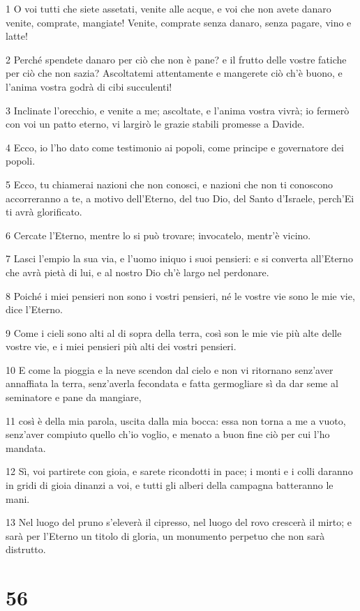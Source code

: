 \par 1 O voi tutti che siete assetati, venite alle acque, e voi che non avete danaro venite, comprate, mangiate! Venite, comprate senza danaro, senza pagare, vino e latte!
\par 2 Perché spendete danaro per ciò che non è pane? e il frutto delle vostre fatiche per ciò che non sazia? Ascoltatemi attentamente e mangerete ciò ch'è buono, e l'anima vostra godrà di cibi succulenti!
\par 3 Inclinate l'orecchio, e venite a me; ascoltate, e l'anima vostra vivrà; io fermerò con voi un patto eterno, vi largirò le grazie stabili promesse a Davide.
\par 4 Ecco, io l'ho dato come testimonio ai popoli, come principe e governatore dei popoli.
\par 5 Ecco, tu chiamerai nazioni che non conosci, e nazioni che non ti conoscono accorreranno a te, a motivo dell'Eterno, del tuo Dio, del Santo d'Israele, perch'Ei ti avrà glorificato.
\par 6 Cercate l'Eterno, mentre lo si può trovare; invocatelo, mentr'è vicino.
\par 7 Lasci l'empio la sua via, e l'uomo iniquo i suoi pensieri: e si converta all'Eterno che avrà pietà di lui, e al nostro Dio ch'è largo nel perdonare.
\par 8 Poiché i miei pensieri non sono i vostri pensieri, né le vostre vie sono le mie vie, dice l'Eterno.
\par 9 Come i cieli sono alti al di sopra della terra, così son le mie vie più alte delle vostre vie, e i miei pensieri più alti dei vostri pensieri.
\par 10 E come la pioggia e la neve scendon dal cielo e non vi ritornano senz'aver annaffiata la terra, senz'averla fecondata e fatta germogliare sì da dar seme al seminatore e pane da mangiare,
\par 11 così è della mia parola, uscita dalla mia bocca: essa non torna a me a vuoto, senz'aver compiuto quello ch'io voglio, e menato a buon fine ciò per cui l'ho mandata.
\par 12 Sì, voi partirete con gioia, e sarete ricondotti in pace; i monti e i colli daranno in gridi di gioia dinanzi a voi, e tutti gli alberi della campagna batteranno le mani.
\par 13 Nel luogo del pruno s'eleverà il cipresso, nel luogo del rovo crescerà il mirto; e sarà per l'Eterno un titolo di gloria, un monumento perpetuo che non sarà distrutto.

\chapter{56}

